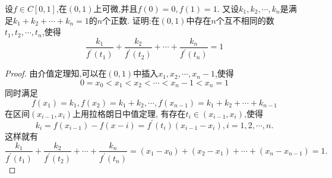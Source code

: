 \documentclass[lang=cn,newtx,10pt,scheme=chinese]{../Template/elegantbook}
\begin{document}
\begin{exercise}
设$f\in C[0,1]$,在$(0,1)$上可微,并且$f(0)=0,f(1)=1$.
又设$k_1,k_2,\cdots,k_n$是满足$k_1+k_2+\cdots+k_n=1$的$n$个正数.
证明:在$(0,1)$中存在$n$个互不相同的数$t_1,t_2,\cdots,t_n$,使得
\begin{equation}
    \frac{k_1}{f^{\prime}\left( t_1 \right)}+\frac{k_2}{f^{\prime}\left( t_2 \right)}+\cdots +\frac{k_n}{f^{\prime}\left( t_n \right)}=1
    \nonumber
\end{equation}

    \begin{proof}
        由介值定理知,可以在$(0,1)$中插入$x_1,x_2,\cdots,x_n-1$,使得
        \begin{equation}
            0=x_0<x_1<x_2<\cdots<x_n-1<x_n=1
            \nonumber
        \end{equation}
        同时满足
    \begin{equation}
        f(x_1)=k_1,f(x_2)=k_1+k_2,\cdots ,f(x_{n-1})=k_1+k_2+\cdots +k_{n-1}
        \nonumber
    \end{equation}
    在区间$(x_{i-1},x_i)$上用拉格朗日中值定理,
    有存在$t_i\in (x_{i-1},x_i)$,使得
    \begin{equation}
        k_i=f(x_{i-1})-f(x-i)=f^{\prime}(t_i)(x_{i-1}-x_i),i=1,2,\cdots,n.
    \nonumber
    \end{equation}
    这样就有
    \begin{equation}
        \frac{k_1}{f^{\prime}\left( t_1 \right)}+\frac{k_2}{f^{\prime}\left( t_2 \right)}+\cdots +\frac{k_n}{f^{\prime}\left( t_n \right)}=
        \left( x_1-x_0 \right) +\left( x_2-x_1 \right) +\cdots +\left( x_n-x_{n-1} \right) =1.
        \nonumber
    \end{equation}
    \end{proof}

\end{exercise}
\end{document}
